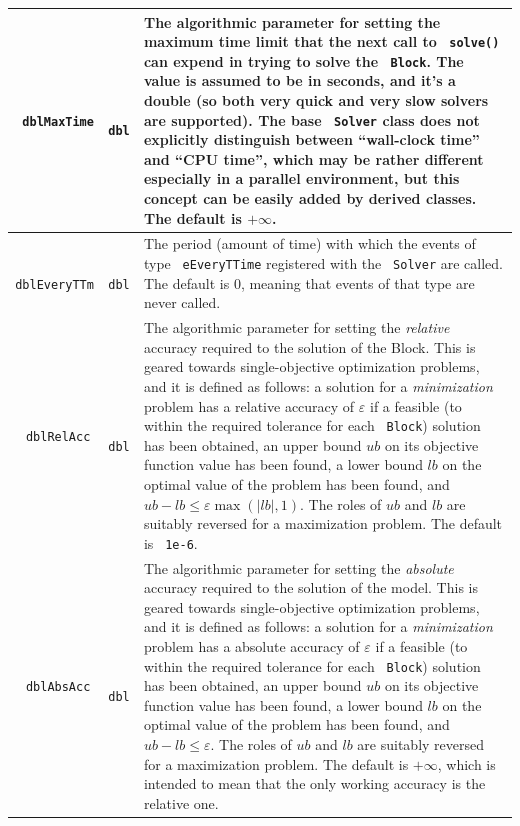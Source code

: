 \documentclass[a4paper]{article}
\newcommand{\code}[1]{\textrm{\texttt{\hyphenchar\font=200 #1}}}
\def\Block{\code{Block}\xspace}
\def\Solver{\code{Solver}\xspace}
\begin{document}
\begin{longtable}{|c|c|p{13cm}|}
 \hline
 \code{dblMaxTime} & \code{dbl} & The algorithmic parameter for setting the maximum time limit that the next call to \code{solve()} can expend in trying to solve the \Block. The value is assumed to be in seconds, and it's a double (so both very quick and very slow solvers are supported). The base \Solver class does not explicitly distinguish between ``wall-clock time'' and ``CPU time'', which may be rather different especially in a parallel environment, but this concept can be easily added by derived classes. The default is $+\infty$.\\
 \hline
 \code{dblEveryTTm} & \code{dbl} & The period (amount of time) with which the events of type \code{eEveryTTime} registered with the \Solver are called. The default is $0$, meaning that events of that type are never called.\\
 \hline
 \code{dblRelAcc} & \code{dbl} & The algorithmic parameter for setting the \emph{relative} accuracy required to the solution of the Block. This is geared towards single-objective optimization problems, and it is defined as follows: a solution for a \emph{minimization} problem has a relative accuracy of $\varepsilon$ if a feasible (to within the required tolerance for each \Block) solution has been obtained, an upper bound $ub$ on its objective function value has been found, a lower bound $lb$ on the optimal value of the problem has been found, and $ub - lb \leq \varepsilon \max( |lb| , 1 )$. The roles of $ub$ and $lb$ are suitably reversed for a maximization problem. The default is \code{1e-6}.\\
 \hline
 \code{dblAbsAcc} & \code{dbl} & The algorithmic parameter for setting the \emph{absolute} accuracy required to the solution of the model. This is geared towards single-objective optimization problems, and it is defined as follows: a solution for a \emph{minimization} problem has a absolute accuracy of $\varepsilon$ if a feasible  (to within the required tolerance for each \Block) solution has been obtained, an upper bound $ub$ on its objective function value has been found, a lower bound $lb$ on the optimal value of the problem has been found, and $ub - lb \leq \varepsilon$. The roles of $ub$ and $lb$ are suitably reversed for a maximization problem. The default is $+\infty$, which is intended to mean that the only working accuracy is the relative one.\\
 \hline

\end{longtable}
\end{document}
